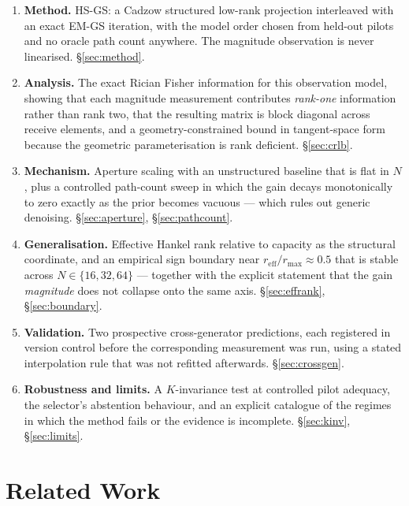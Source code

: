 \documentclass[journal]{IEEEtran}
\newcommand{\reff}{r_{\mathrm{eff}}}
\newcommand{\rmax}{r_{\max}}
\begin{document}
\begin{enumerate}
\item[\textbf{A.}] \textbf{Method.} HS-GS: a Cadzow structured low-rank
projection interleaved with an exact EM-GS iteration, with the model order
chosen from held-out pilots and no oracle path count anywhere. The magnitude
observation is never linearised. \S\ref{sec:method}.

\item[\textbf{B.}] \textbf{Analysis.} The exact Rician Fisher information for
this observation model, showing that each magnitude measurement contributes
\emph{rank-one} information rather than rank two, that the resulting matrix is
block diagonal across receive elements, and a geometry-constrained bound in
tangent-space form because the geometric parameterisation is rank deficient.
\S\ref{sec:crlb}.

\item[\textbf{C.}] \textbf{Mechanism.} Aperture scaling with an unstructured
baseline that is flat in $N$, plus a controlled path-count sweep in which the
gain decays monotonically to zero exactly as the prior becomes vacuous ---
which rules out generic denoising. \S\ref{sec:aperture},
\S\ref{sec:pathcount}.

\item[\textbf{D.}] \textbf{Generalisation.} Effective Hankel rank relative to
capacity as the structural coordinate, and an empirical sign boundary near
$\reff/\rmax\approx0.5$ that is stable across $N\in\{16,32,64\}$ ---
together with the explicit statement that the gain \emph{magnitude} does not
collapse onto the same axis. \S\ref{sec:effrank}, \S\ref{sec:boundary}.

\item[\textbf{E.}] \textbf{Validation.} Two prospective cross-generator
predictions, each registered in version control before the corresponding
measurement was run, using a stated interpolation rule that was not refitted
afterwards. \S\ref{sec:crossgen}.

\item[\textbf{F.}] \textbf{Robustness and limits.} A $K$-invariance test at
controlled pilot adequacy, the selector's abstention behaviour, and an explicit
catalogue of the regimes in which the method fails or the evidence is
incomplete. \S\ref{sec:kinv}, \S\ref{sec:limits}.
\end{enumerate}

\section{Related Work}
\end{document}
